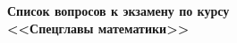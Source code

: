 \documentclass[14pt]{extarticle}
\begin{document}
\begin{center}
\Large\bf
Список вопросов к экзамену по курсу\\ <<Спецглавы математики>>
\end{center}

\end{document}
